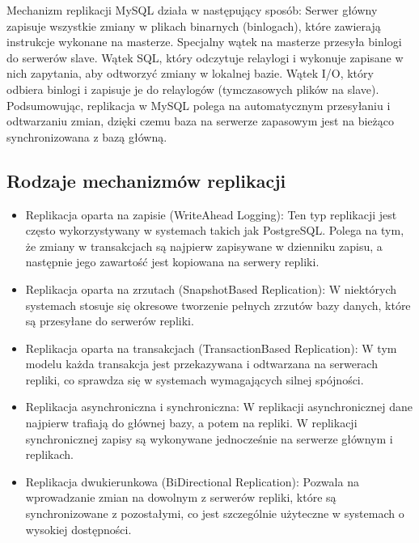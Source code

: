\documentclass[a4paper,11pt,openany,english]{sphinxmanual}
\begin{document}
\sphinxAtStartPar
Mechanizm replikacji MySQL działa w następujący sposób:
\sphinxhyphen{} Serwer główny zapisuje wszystkie zmiany w plikach binarnych (bin\sphinxhyphen{}logach), które zawierają instrukcje wykonane na masterze.
\sphinxhyphen{} Specjalny wątek na masterze przesyła bin\sphinxhyphen{}logi do serwerów slave.
\sphinxhyphen{} Wątek SQL, który odczytuje relay\sphinxhyphen{}logi i wykonuje zapisane w nich zapytania, aby odtworzyć zmiany w lokalnej bazie.
\sphinxhyphen{} Wątek I/O, który odbiera bin\sphinxhyphen{}logi i zapisuje je do relay\sphinxhyphen{}logów (tymczasowych plików na slave).
Podsumowując, replikacja w MySQL polega na automatycznym przesyłaniu i odtwarzaniu zmian, dzięki czemu baza na serwerze zapasowym jest na bieżąco synchronizowana z bazą główną.


\subsection{Rodzaje mechanizmów replikacji}
\label{\detokenize{rozdzial2/index:rodzaje-mechanizmow-replikacji}}\begin{itemize}
\item {} 
\sphinxAtStartPar
Replikacja oparta na zapisie (Write\sphinxhyphen{}Ahead Logging): Ten typ replikacji jest często wykorzystywany w systemach takich jak PostgreSQL. Polega na tym, że zmiany w transakcjach są najpierw zapisywane w dzienniku zapisu, a następnie jego zawartość jest kopiowana na serwery repliki.

\item {} 
\sphinxAtStartPar
Replikacja oparta na zrzutach (Snapshot\sphinxhyphen{}Based Replication): W niektórych systemach stosuje się okresowe tworzenie pełnych zrzutów bazy danych, które są przesyłane do serwerów repliki.

\item {} 
\sphinxAtStartPar
Replikacja oparta na transakcjach (Transaction\sphinxhyphen{}Based Replication): W tym modelu każda transakcja jest przekazywana i odtwarzana na serwerach repliki, co sprawdza się w systemach wymagających silnej spójności.

\item {} 
\sphinxAtStartPar
Replikacja asynchroniczna i synchroniczna: W replikacji asynchronicznej dane najpierw trafiają do głównej bazy, a potem na repliki. W replikacji synchronicznej zapisy są wykonywane jednocześnie na serwerze głównym i replikach.

\item {} 
\sphinxAtStartPar
Replikacja dwukierunkowa (Bi\sphinxhyphen{}Directional Replication): Pozwala na wprowadzanie zmian na dowolnym z serwerów repliki, które są synchronizowane z pozostałymi, co jest szczególnie użyteczne w systemach o wysokiej dostępności.

\end{itemize}
\end{document}
